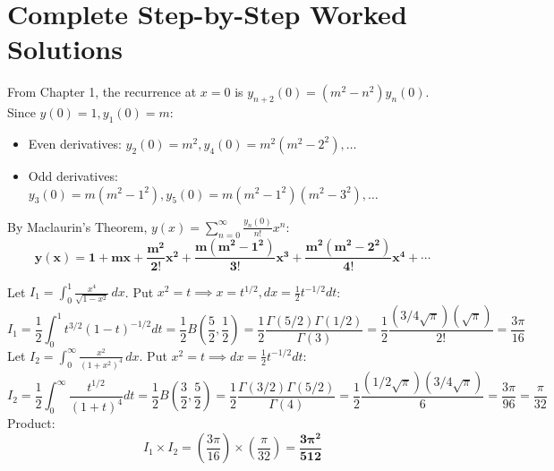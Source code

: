 \section{Complete Step-by-Step Worked Solutions}

\begin{solutionbox}
From Chapter 1, the recurrence at $x = 0$ is $y_{n+2}(0) = (m^2 - n^2)y_n(0)$.
Since $y(0) = 1, y_1(0) = m$:
\begin{itemize}
    \item Even derivatives: $y_2(0) = m^2, y_4(0) = m^2(m^2-2^2), \dots$
    \item Odd derivatives: $y_3(0) = m(m^2-1^2), y_5(0) = m(m^2-1^2)(m^2-3^2), \dots$
\end{itemize}
By Maclaurin's Theorem, $y(x) = \sum_{n=0}^\infty \frac{y_n(0)}{n!} x^n$:
\begin{equation*}
    \mathbf{y(x) = 1 + mx + \frac{m^2}{2!}x^2 + \frac{m(m^2-1^2)}{3!}x^3 + \frac{m^2(m^2-2^2)}{4!}x^4 + \cdots}
\end{equation*}
\end{solutionbox}

\begin{solutionbox}
Let $I_1 = \int_0^1 \frac{x^4}{\sqrt{1-x^2}}\,dx$. Put $x^2 = t \implies x = t^{1/2}, dx = \frac{1}{2}t^{-1/2}dt$:
\begin{equation*}
    I_1 = \frac{1}{2}\int_0^1 t^{3/2}(1-t)^{-1/2}dt = \frac{1}{2}B\left(\frac{5}{2}, \frac{1}{2}\right) = \frac{1}{2}\frac{\Gamma(5/2)\Gamma(1/2)}{\Gamma(3)} = \frac{1}{2}\frac{(3/4\sqrt{\pi})(\sqrt{\pi})}{2!} = \frac{3\pi}{16}
\end{equation*}
Let $I_2 = \int_0^\infty \frac{x^2}{(1+x^2)^4}\,dx$. Put $x^2 = t \implies dx = \frac{1}{2}t^{-1/2}dt$:
\begin{equation*}
    I_2 = \frac{1}{2}\int_0^\infty \frac{t^{1/2}}{(1+t)^4}dt = \frac{1}{2}B\left(\frac{3}{2}, \frac{5}{2}\right) = \frac{1}{2}\frac{\Gamma(3/2)\Gamma(5/2)}{\Gamma(4)} = \frac{1}{2}\frac{(1/2\sqrt{\pi})(3/4\sqrt{\pi})}{6} = \frac{3\pi}{96} = \frac{\pi}{32}
\end{equation*}
Product:
\begin{equation*}
    I_1 \times I_2 = \left(\frac{3\pi}{16}\right) \times \left(\frac{\pi}{32}\right) = \mathbf{\frac{3\pi^2}{512}}
\end{equation*}
\end{solutionbox}

